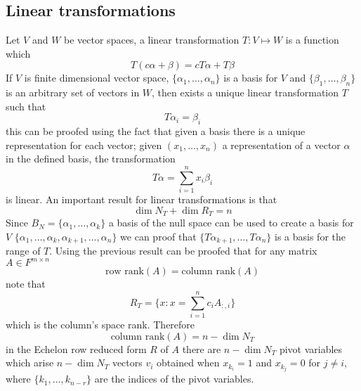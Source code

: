 \documentclass[../../../main.tex]{subfiles}
\begin{document}
\subsection{Linear transformations}
Let $V$ and $W$ be vector spaces, a linear transformation $T:V\mapsto W$ is a function which
\begin{equation*}
    T(c\alpha + \beta) = cT\alpha + T\beta
\end{equation*}
If $V$ is finite dimensional vector space, $\{\alpha_1,\dots,\alpha_n\}$ is a basis for $V$ and $\{\beta_1,\dots,\beta_n\}$ is an arbitrary set of vectors in $W$, then exists a unique linear transformation $T$ such that 
\begin{equation*}
    T\alpha_i = \beta_i
\end{equation*}
this can be proofed using the fact that given a basis there is a unique representation for each vector; given $(x_1,\dots,x_n)$ a representation of a vector $\alpha$ in the defined basis, the transformation
\begin{equation*}
    T\alpha = \sum_{i=1}^n x_i \beta_i
\end{equation*}
is linear.
An important result for linear transformations is that
\begin{equation*}
    \dim N_T + \dim R_T = n
\end{equation*}
Since $B_N = \{\alpha_1,\dots,\alpha_k\}$ a basis of the null space can be used to create a basis for $V$ $\{\alpha_1,\dots,\alpha_k,\alpha_{k+1},\dots,\alpha_n\}$ we can proof that $\{T\alpha_{k+1},\dots,T\alpha_n\}$ is a basis for the range of $T$.
Using the previous result can be proofed that for any matrix $A\in F^{m\times n}$
\begin{equation*}
    \text{row rank} (A) = \text{column rank} (A)
\end{equation*}
note that
\begin{equation*}
    R_T = \{x: x=\sum_{i=1}^n c_i A_{:,i}\}
\end{equation*}
which is the column's space rank. Therefore 
\begin{equation*}
    \text{column rank} (A) = n - \dim N_T
\end{equation*}
in the Echelon row reduced form $R$ of $A$ there are $n - \dim N_T$ pivot variables which arise $n - \dim N_T$ vectors $v_i$ obtained when $x_{k_i}=1$ and $x_{k_j}=0$ for $j\neq i$, where $\{k_1,\dots,k_{n-r}\}$ are the indices of the pivot variables.
\end{document}
